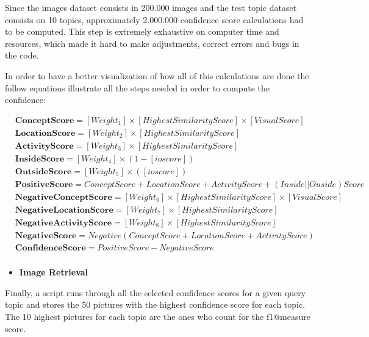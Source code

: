     Since the images dataset consists in 200.000 images and the test topic dataset consists on 10 topics, approximately 2.000.000 confidence score calculations had to be computed. This step is extremely exhaustive on computer time and resources, which made it hard to make adjustments, correct errors and bugs in the code.
        
   


    In order to have a better visualization of how all of this calculations are done the follow equations illustrate all the steps needed in order to compute the confidence:

    \begin{align*}
        &\textbf{ConceptScore}  =   [Weight_1]\times[HighestSimilarityScore]\times[VisualScore] \\ 
        &\textbf{LocationScore} = [Weight_2]\times[HighestSimilarityScore] \\ 
      &\textbf{ActivityScore} =  [Weight_3]\times[HighestSimilarityScore]\\
        &\textbf{InsideScore}   =  [Weight_4]\times(1-[ioscore])\\
        &\textbf{OutsideScore}  =  [Weight_5]\times([ioscore])\\
        &\textbf{PositiveScore}  =  ConceptScore + LocationScore + ActivityScore + (Inside||Ouside)Score\\
        &\textbf{NegativeConceptScore}  =  [Weight_6]\times[HighestSimilarityScore]\times[VisualScore]\\
        &\textbf{NegativeLocationScore}  =  [Weight_7]\times[HighestSimilarityScore]\\
        &\textbf{NegativeActivityScore}  =  [Weight_8]\times[HighestSimilarityScore]\\
        &\textbf{NegativeScore}  =  Negative(ConceptScore + LocationScore + ActivityScore) \\
        &\textbf{ConfidenceScore}  =  PositiveScore - NegativeScore\\
  \end{align*}
  

  \begin{itemize}
    \item \textbf{Image Retrieval}
  \end{itemize}

    Finally, a script runs through all the selected confidence scores for a given
    query topic and stores the 50 pictures with the highest confidence score for each topic. The 10 highest pictures for each topic are the ones who count for the f1@measure score.
       
